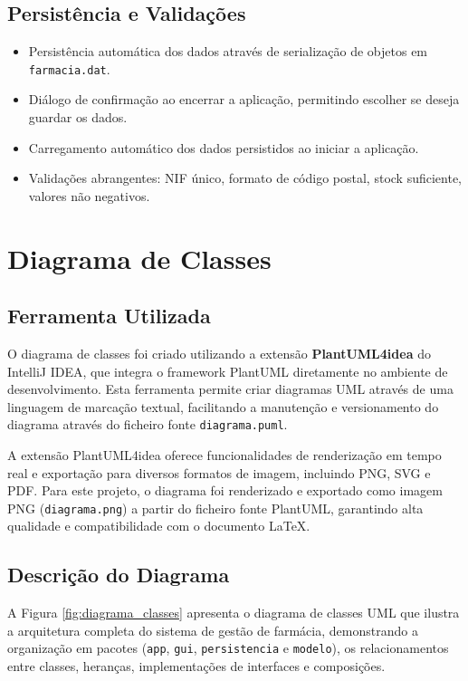 \documentclass[a4paper,12pt]{article}
\begin{document}
\subsection{Persistência e Validações}
\begin{itemize}
    \item Persistência automática dos dados através de serialização de objetos em \texttt{farmacia.dat}.
    \item Diálogo de confirmação ao encerrar a aplicação, permitindo escolher se deseja guardar os dados.
    \item Carregamento automático dos dados persistidos ao iniciar a aplicação.
    \item Validações abrangentes: NIF único, formato de código postal, stock suficiente, valores não negativos.
\end{itemize}

\newpage

\section{Diagrama de Classes}

\subsection{Ferramenta Utilizada}
O diagrama de classes foi criado utilizando a extensão \textbf{PlantUML4idea} do IntelliJ IDEA, que integra o framework PlantUML diretamente no ambiente de desenvolvimento. Esta ferramenta permite criar diagramas UML através de uma linguagem de marcação textual, facilitando a manutenção e versionamento do diagrama através do ficheiro fonte \texttt{diagrama.puml}.

A extensão PlantUML4idea oferece funcionalidades de renderização em tempo real e exportação para diversos formatos de imagem, incluindo PNG, SVG e PDF. Para este projeto, o diagrama foi renderizado e exportado como imagem PNG (\texttt{diagrama.png}) a partir do ficheiro fonte PlantUML, garantindo alta qualidade e compatibilidade com o documento LaTeX.

\subsection{Descrição do Diagrama}
A Figura \ref{fig:diagrama_classes} apresenta o diagrama de classes UML que ilustra a arquitetura completa do sistema de gestão de farmácia, demonstrando a organização em pacotes (\texttt{app}, \texttt{gui}, \texttt{persistencia} e \texttt{modelo}), os relacionamentos entre classes, heranças, implementações de interfaces e composições.
\end{document}
